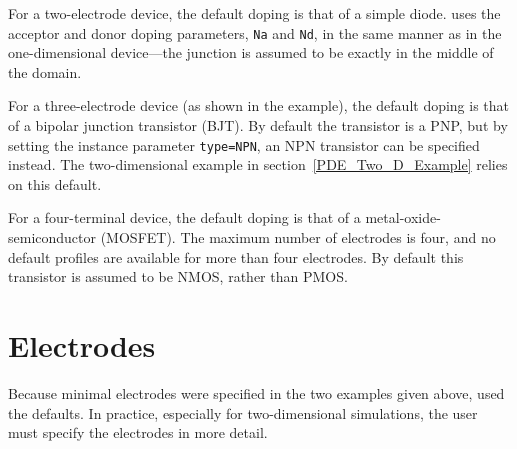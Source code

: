 For a two-electrode device, the default doping is that of a simple diode.
\Xyce{} uses the acceptor and donor doping parameters, \texttt{Na} and
\texttt{Nd}, in the same manner as in the one-dimensional device---the junction
is assumed to be exactly in the middle of the domain.

For a three-electrode device (as shown in the example), the default doping is
that of a bipolar junction transistor (BJT).  By default the transistor is a
PNP, but by setting the instance parameter \texttt{type=NPN}, an NPN transistor
can be specified instead.  The two-dimensional example in
section~\ref{PDE_Two_D_Example} relies on this default.  

For a four-terminal device, the default doping is that of a
metal-oxide-semiconductor (MOSFET).  The maximum number of electrodes is four,
and no default profiles are available for more than four electrodes.  By
default this transistor is assumed to be NMOS, rather than PMOS.


\clearpage
\section{Electrodes} \label{PDE_Electrode}
Because minimal electrodes were specified in the two examples given above, \Xyce{}
used the defaults.  In practice, especially for two-dimensional simulations, the 
user must specify the electrodes in more detail.

